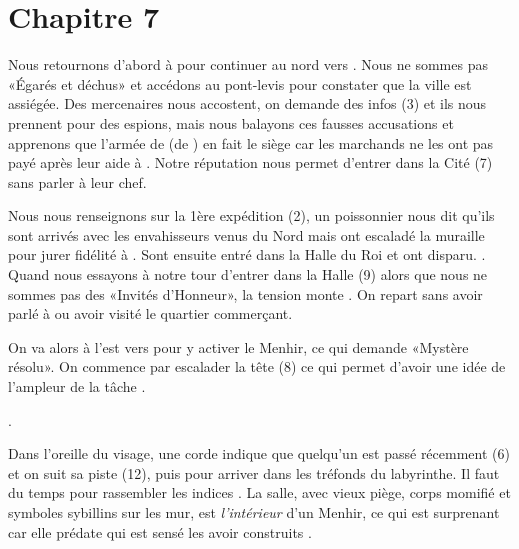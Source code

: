 \documentclass[11pt]{article}
\begin{document}
\section{Chapitre 7}

Nous retournons d'abord à \sousmuraille{} pour continuer au nord vers \boismuraille{}. Nous ne sommes pas «Égarés et déchus» et accédons au pont-levis pour constater que la ville est assiégée. Des mercenaires nous accostent, on demande des infos (3) et ils nous prennent pour des espions, mais nous balayons ces fausses accusations et apprenons que l'armée de \nidcorbeaux{} (de \mordred{}) en fait le siège car les marchands ne les ont pas payé après leur aide à \loincomtat{} . Notre réputation nous permet d'entrer dans la Cité (7) sans parler à leur chef.

Nous nous renseignons sur la 1ère expédition (2), un poissonnier nous dit qu'ils sont arrivés avec les envahisseurs venus du Nord mais ont escaladé la muraille pour jurer fidélité à \ultan{}. Sont ensuite entré dans la Halle du Roi et ont disparu. . Quand nous essayons à notre tour d'entrer dans la Halle (9) alors que nous ne sommes pas des «Invités d'Honneur», la tension monte . On repart sans avoir parlé à \ultan{} ou avoir visité le quartier commerçant.

On va alors à l'est vers \visageserein{}  pour y activer le Menhir, ce qui demande «Mystère résolu». On commence par escalader la tête (8) ce qui permet d'avoir une idée de l'ampleur de la tâche \gain{\terror[-1]}.

.

Dans l'oreille du visage, une corde indique que quelqu'un est passé récemment (6) et on suit sa piste (12), puis  pour arriver dans les tréfonds du labyrinthe. Il faut du temps pour rassembler les indices . La salle, avec vieux piège, corps momifié et symboles sybillins sur les mur, est \emph{l'intérieur} d'un Menhir, ce qui est surprenant car elle prédate \arthur{} qui est sensé les avoir construits .
\end{document}
